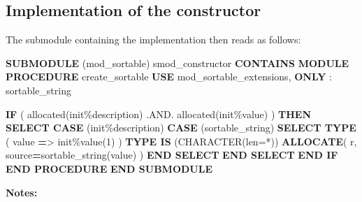\documentclass[
]{scrartcl}
\newenvironment{Shaded}{}{}
\newcommand{\DataTypeTok}[1]{\textcolor[rgb]{0.56,0.13,0.00}{#1}}
\newcommand{\DecValTok}[1]{\textcolor[rgb]{0.25,0.63,0.44}{#1}}
\newcommand{\FunctionTok}[1]{\textcolor[rgb]{0.02,0.16,0.49}{#1}}
\newcommand{\KeywordTok}[1]{\textcolor[rgb]{0.00,0.44,0.13}{\textbf{#1}}}
\newcommand{\NormalTok}[1]{#1}
\newcommand{\OperatorTok}[1]{\textcolor[rgb]{0.40,0.40,0.40}{#1}}
\newcommand{\StringTok}[1]{\textcolor[rgb]{0.25,0.44,0.63}{#1}}
\begin{document}
\subsection{Implementation of the
constructor}\label{implementation-of-the-constructor}

The submodule containing the implementation then reads as follows:

\begin{Shaded}
\begin{Highlighting}[]
\KeywordTok{SUBMODULE}\NormalTok{ (mod\_sortable) smod\_constructor}
\KeywordTok{CONTAINS}
   \KeywordTok{MODULE PROCEDURE}\NormalTok{ create\_sortable}
      \KeywordTok{USE}\NormalTok{ mod\_sortable\_extensions, }\KeywordTok{ONLY}\NormalTok{ : sortable\_string}

      \KeywordTok{IF}\NormalTok{ ( }\FunctionTok{allocated}\NormalTok{(init}\OperatorTok{\%}\NormalTok{description) }\OperatorTok{.AND.} \FunctionTok{allocated}\NormalTok{(init}\OperatorTok{\%}\DataTypeTok{value}\NormalTok{) ) }\KeywordTok{THEN}
         \KeywordTok{SELECT CASE}\NormalTok{ (init}\OperatorTok{\%}\NormalTok{description)}
         \KeywordTok{CASE}\NormalTok{ (}\StringTok{\textquotesingle{}sortable\_string\textquotesingle{}}\NormalTok{)}
            \KeywordTok{SELECT TYPE}\NormalTok{ ( }\DataTypeTok{value} \KeywordTok{=}\OperatorTok{\textgreater{}}\NormalTok{ init}\OperatorTok{\%}\DataTypeTok{value}\NormalTok{(}\DecValTok{1}\NormalTok{) )}
            \KeywordTok{TYPE IS}\NormalTok{ (}\DataTypeTok{CHARACTER(len=*)}\NormalTok{)}
               \KeywordTok{ALLOCATE}\NormalTok{( r, source}\KeywordTok{=}\NormalTok{sortable\_string(}\DataTypeTok{value}\NormalTok{) )}
            \KeywordTok{END SELECT}
         \KeywordTok{END SELECT}
      \KeywordTok{END IF}
   \KeywordTok{END PROCEDURE}
\KeywordTok{END SUBMODULE}
\end{Highlighting}
\end{Shaded}

\textbf{Notes:}
\end{document}
